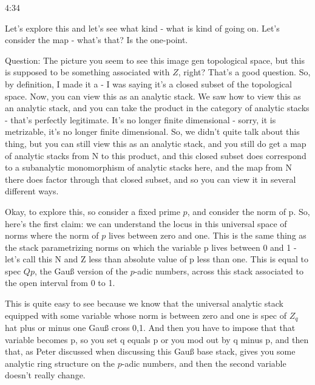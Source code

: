 \begin{unfinished}{4:34}
\begin{example}
\begin{example}
\begin{example}
Let's explore this and let's see what kind - what is kind of going on. Let's consider the map - what's that? Is the one-point.

Question: The picture you seem to see this image gen topological space, but this is supposed to be something associated with $Z$, right? That's a good question. So, by definition, I made it a - I was saying it's a closed subset of the topological space. Now, you can view this as an analytic stack. We saw how to view this as an analytic stack, and you can take the product in the category of analytic stacks - that's perfectly legitimate. It's no longer finite dimensional - sorry, it is metrizable, it's no longer finite dimensional. So, we didn't quite talk about this thing, but you can still view this as an analytic stack, and you still do get a map of analytic stacks from N to this product, and this closed subset does correspond to a subanalytic monomorphism of analytic stacks here, and the map from N there does factor through that closed subset, and so you can view it in several different ways.

Okay, to explore this, so consider a fixed prime $p$, and consider the norm of p. So, here's the first claim: we can understand the locus in this universal space of norms where the norm of $p$ lives between zero and one. This is the same thing as the stack parametrizing norms on which the variable p lives between 0 and 1 - let's call this N and Z less than absolute value of p less than one. This is equal to spec $Qp$, the Gauß version of the $p$-adic numbers, across this stack associated to the open interval from 0 to 1.

This is quite easy to see because we know that the universal analytic stack equipped with some variable whose norm is between zero and one is spec of $Z_q$ hat plus or minus one Gauß cross 0,1. And then you have to impose that that variable becomes p, so you set q equals p or you mod out by q minus p, and then that, as Peter discussed when discussing this Gauß base stack, gives you some analytic ring structure on the $p$-adic numbers, and then the second variable doesn't really change.


\end{example}
\end{example}
\end{example}
\end{unfinished}
